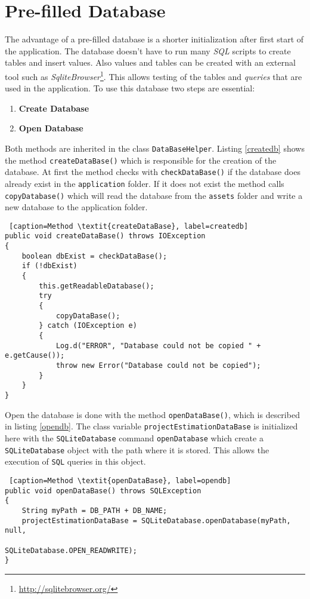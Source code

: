 \section{Pre-filled Database}\label{exDB}

The advantage of a pre-filled database is a shorter initialization after first start of the application. The database doesn't have to run many \textit{SQL} scripts to create tables and insert values. Also values and tables can be created with an external tool such as \textit{SqliteBrowser}\footnote{\url{http://sqlitebrowser.org/}}. This allows testing of the tables and \textit{queries} that are used in the application. To use this database two steps are essential:
\begin{enumerate}
	\item \textbf{Create Database}
	\item \textbf{Open Database}
\end{enumerate}
Both methods are inherited in the class \texttt{DataBaseHelper}. Listing \ref{createdb} shows the method \texttt{createDataBase()} which is responsible for the creation of the database. At first the method checks with \texttt{checkDataBase()} if the database does already exist in the \texttt{application} folder. If it does not exist the method calls \texttt{copyDatabase()} which will read the database from the \texttt{assets} folder and write a new database to the application folder.
\begin{lstlisting} [caption=Method \textit{createDataBase}, label=createdb] 
public void createDataBase() throws IOException
{
	boolean dbExist = checkDataBase();
	if (!dbExist)
	{
		this.getReadableDatabase();
		try
		{
			copyDataBase();
		} catch (IOException e)
		{
			Log.d("ERROR", "Database could not be copied " + e.getCause());
			throw new Error("Database could not be copied");
		}
	}
}
\end{lstlisting}
Open the database is done with the method \texttt{openDataBase()}, which is described in listing \ref{opendb}. The class variable \texttt{projectEstimationDataBase} is initialized here with the \texttt{SQLiteDatabase} command \texttt{openDatabase} which create a \texttt{SQLiteDatabase} object with the path where it is stored. This allows the execution of \texttt{SQL} queries in this object.
\begin{lstlisting} [caption=Method \textit{openDataBase}, label=opendb] 
public void openDataBase() throws SQLException
{
	String myPath = DB_PATH + DB_NAME;
	projectEstimationDataBase = SQLiteDatabase.openDatabase(myPath, null,
										 SQLiteDatabase.OPEN_READWRITE);
}
\end{lstlisting}
